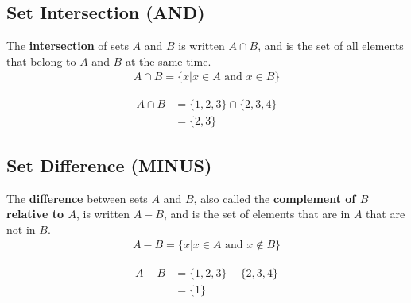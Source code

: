 \documentclass[../notes.tex]{subfiles}
\begin{document}
      \subsection{Set Intersection (AND)}
        The \textbf{intersection} of sets $A$ and $B$ is written $A \cap  B$, and is the set of all elements that belong to $A$ and $B$ at the same time.
        \begin{align*}
          A \cap B = \biggl\{x | x \in A \text{ and } x \in B\biggr\}
        \end{align*}
        \begin{center}
        \end{center}
        \begin{examplebox}
          \begin{align*}
            A \cap B &= \{1, 2, 3\} \cap \{2, 3, 4\}\\
            &= \{2, 3\}
          \end{align*}
        \end{examplebox}

      \subsection{Set Difference (MINUS)}
        The \textbf{difference} between sets $A$ and $B$, also called the \textbf{complement of $B$ relative to $A$}, is written $A - B$, and is the set of elements that are in $A$ that are not in $B$.
        \begin{align*}
          A - B = \biggl\{x | x \in A \text{ and } x \notin B\biggr\}
        \end{align*}
        \begin{center}
        \end{center}
        \begin{examplebox}
          \begin{align*}
            A - B &= \{1, 2, 3\} - \{2, 3, 4\}\\
            &= \{1\}
          \end{align*}
        \end{examplebox}
\end{document}

